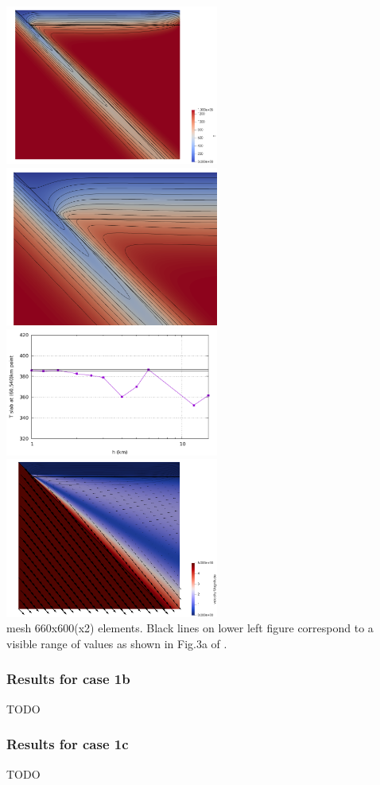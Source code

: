 \begin{center}
\includegraphics[width=7cm]{python_codes/fieldstone_45/images/temp}
\includegraphics[width=7cm]{python_codes/fieldstone_45/images/temp_zoom}\\
\includegraphics[width=7cm]{python_codes/fieldstone_45/images/T60.pdf}
\includegraphics[width=7cm]{python_codes/fieldstone_45/images/vel}\\
{\small mesh 660x600(x2) elements. Black lines on lower left figure 
correspond to a visible range of values as shown in Fig.3a of \cite{vack08}.}
\end{center}


\subsubsection{Results for case 1b}

TODO

\subsubsection{Results for case 1c}

TODO






